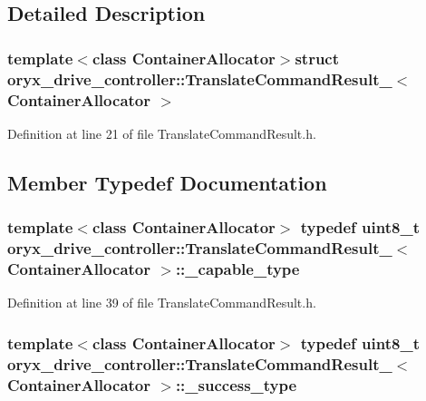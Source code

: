 \subsection{\-Detailed \-Description}
\subsubsection*{template$<$class \-Container\-Allocator$>$struct oryx\-\_\-drive\-\_\-controller\-::\-Translate\-Command\-Result\-\_\-$<$ Container\-Allocator $>$}



\-Definition at line 21 of file \-Translate\-Command\-Result.\-h.



\subsection{\-Member \-Typedef \-Documentation}
\subsubsection[{\-\_\-capable\-\_\-type}]{\setlength{\rightskip}{0pt plus 5cm}template$<$class \-Container\-Allocator$>$ typedef uint8\-\_\-t {\bf oryx\-\_\-drive\-\_\-controller\-::\-Translate\-Command\-Result\-\_\-}$<$ \-Container\-Allocator $>$\-::{\bf \-\_\-capable\-\_\-type}}\label{structoryx__drive__controller_1_1TranslateCommandResult___a047bb1461b481a8263da496ce754b593}


\-Definition at line 39 of file \-Translate\-Command\-Result.\-h.

\subsubsection[{\-\_\-success\-\_\-type}]{\setlength{\rightskip}{0pt plus 5cm}template$<$class \-Container\-Allocator$>$ typedef uint8\-\_\-t {\bf oryx\-\_\-drive\-\_\-controller\-::\-Translate\-Command\-Result\-\_\-}$<$ \-Container\-Allocator $>$\-::{\bf \-\_\-success\-\_\-type}}\label{structoryx__drive__controller_1_1TranslateCommandResult___aa21104e8449f0ed727fbbb8843150e2c}


